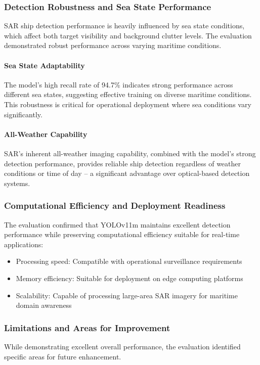 \documentclass{article}
\begin{document}
	
	
	
	\subsubsection{Detection Robustness and Sea State Performance}
	SAR ship detection performance is heavily influenced by sea state conditions, which affect both target visibility and background clutter levels. The evaluation demonstrated robust performance across varying maritime conditions.
	
	\paragraph{Sea State Adaptability}
	The model's high recall rate of 94.7\% indicates strong performance across different sea states, suggesting effective training on diverse maritime conditions. This robustness is critical for operational deployment where sea conditions vary significantly.
	
	\paragraph{All-Weather Capability}
	SAR's inherent all-weather imaging capability, combined with the model's strong detection performance, provides reliable ship detection regardless of weather conditions or time of day -- a significant advantage over optical-based detection systems.
	
	\subsubsection{Computational Efficiency and Deployment Readiness}
	The evaluation confirmed that YOLOv11m maintains excellent detection performance while preserving computational efficiency suitable for real-time applications:
	\begin{itemize}
		\item Processing speed: Compatible with operational surveillance requirements
		\item Memory efficiency: Suitable for deployment on edge computing platforms
		\item Scalability: Capable of processing large-area SAR imagery for maritime domain awareness
	\end{itemize}
	
	\subsubsection{Limitations and Areas for Improvement}
	While demonstrating excellent overall performance, the evaluation identified specific areas for future enhancement.
	
\end{document}
